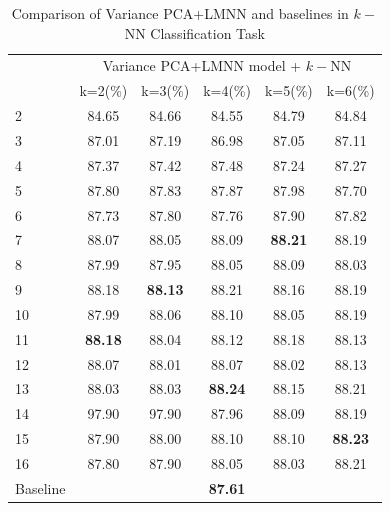 \documentclass[conference]{IEEEtran}
\begin{document}
\begin{table}[htbp]
	\centering
 	\newcommand{\tabincell}[2]{\begin{tabular}{@{}#1@{}}#2\end{tabular}}
 	\renewcommand\arraystretch{1.0}
 	\caption{Comparison of Variance PCA+LMNN and baselines in $k-$NN Classification Task}
 	\label{base6}%
 		\begin{tabular}{@{}p{1cm}<{\centering}|c|c|c|c|c}
 		\hline
 		\multirow{2}{*}{\diagbox[height=2\line,width=1.42cm,font=\tiny]{$k$}{Acc.}{$\mathit{M}$}} &
 		\multicolumn{5}{c}{Variance PCA+LMNN model + $k-$NN}\\
 		\cline{2-6}
		    & {k=2(\%)} & {k=3(\%)} & {k=4(\%)} & {k=5(\%)} & {k=6(\%)}\\
 		\hline
 		2   &84.65  &84.66  &84.55  &84.79  &84.84  \\
 		3   &87.01  &87.19  &86.98  &87.05  &87.11  \\
 		4   &87.37  &87.42  &87.48  &87.24  &87.27  \\
 		5   &87.80  &87.83  &87.87  &87.98  &87.70  \\
 		6   &87.73  &87.80  &87.76  &87.90  &87.82  \\
 		7   &88.07  &88.05  &88.09  & \textbf{88.21} &88.19  \\
 		8   &87.99  &87.95  &88.05  &88.09  &88.03  \\
 		9   &88.18  & \textbf{88.13} &88.21  &88.16  &88.19  \\
 		10   &87.99  &88.06  &88.10  &88.05  &88.19  \\
 		11   & \textbf{88.18} &88.04  &88.12  &88.18  &88.13  \\
 		12   &88.07  &88.01  &88.07  &88.02  &88.13  \\
 		13   &88.03  &88.03  & \textbf{88.24} &88.15  &88.21  \\
 		14   &97.90  &97.90  &87.96  &88.09  &88.19  \\
 		15   &87.90  &88.00  &88.10  &88.10  & \textbf{88.23} \\
		16   &87.80  &87.90  &88.05  &88.03  &88.21  \\  
		\hline
		Baseline & \multicolumn{5}{c}{\textbf{87.61}} \\
 		\hline
 	\end{tabular}
\end{table}
\end{document}
